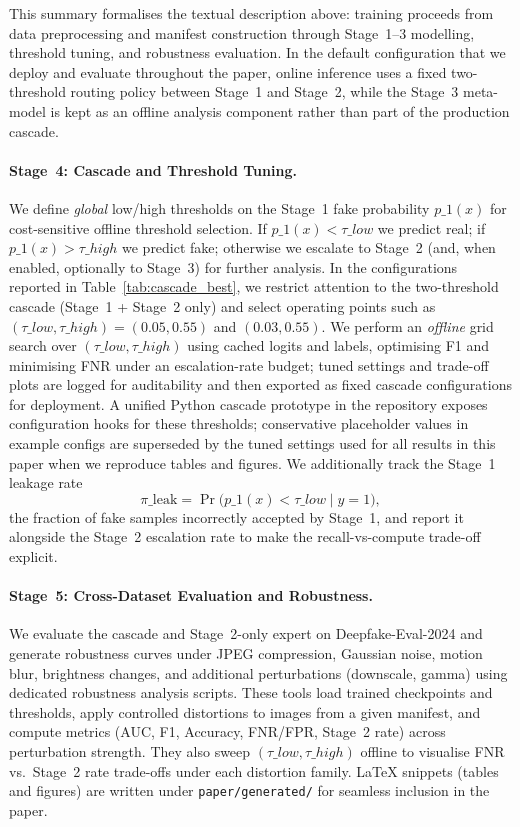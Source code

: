 This summary formalises the textual description above: training proceeds from data preprocessing and manifest construction through Stage~1–3 modelling, threshold tuning, and robustness evaluation. In the default configuration that we deploy and evaluate throughout the paper, online inference uses a fixed two\hyp threshold routing policy between Stage~1 and Stage~2, while the Stage~3 meta\hyp model is kept as an offline analysis component rather than part of the production cascade.

\paragraph{Stage~4: Cascade and Threshold Tuning.} We define \emph{global} low/high thresholds on the Stage~1 fake probability $p\_1(x)$ for cost\hyp sensitive offline threshold selection. If $p\_1(x) < \tau\_{low}$ we predict real; if $p\_1(x) > \tau\_{high}$ we predict fake; otherwise we escalate to Stage~2 (and, when enabled, optionally to Stage~3) for further analysis. In the configurations reported in Table~\ref{tab:cascade_best}, we restrict attention to the two-threshold cascade (Stage~1 + Stage~2 only) and select operating points such as $(\tau\_{low},\tau\_{high})=(0.05,0.55)$ and $(0.03,0.55)$. We perform an \emph{offline} grid search over $(\tau\_{low},\tau\_{high})$ using cached logits and labels, optimising F1 and minimising FNR under an escalation\hyp rate budget; tuned settings and trade\hyp off plots are logged for auditability and then exported as fixed cascade configurations for deployment. A unified Python cascade prototype in the repository exposes configuration hooks for these thresholds; conservative placeholder values in example configs are superseded by the tuned settings used for all results in this paper when we reproduce tables and figures. We additionally track the Stage~1 leakage rate
\[
\pi\_{\mathrm{leak}} = \Pr\big(p\_1(x) < \tau\_{low} \mid y=1\big),
\]
the fraction of fake samples incorrectly accepted by Stage~1, and report it alongside the Stage~2 escalation rate to make the recall\hyp vs\hyp compute trade\hyp off explicit.

\paragraph{Stage~5: Cross-Dataset Evaluation and Robustness.} We evaluate the cascade and Stage~2\hyp only expert on Deepfake\hyp Eval\hyp 2024 and generate robustness curves under JPEG compression, Gaussian noise, motion blur, brightness changes, and additional perturbations (downscale, gamma) using dedicated robustness analysis scripts. These tools load trained checkpoints and thresholds, apply controlled distortions to images from a given manifest, and compute metrics (AUC, F1, Accuracy, FNR/FPR, Stage~2 rate) across perturbation strength. They also sweep $(\tau\_{low},\tau\_{high})$ offline to visualise FNR vs.\ Stage~2 rate trade\hyp offs under each distortion family. LaTeX snippets (tables and figures) are written under \verb|paper/generated/| for seamless inclusion in the paper.

